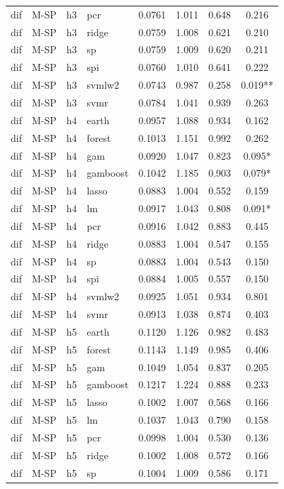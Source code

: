 \begin{ThreePartTable}
\begin{longtable}[t]{llclcccc}
dif & M-SP & h3 & pcr & 0.0761 & 1.011 & 0.648 & 0.216\\
dif & M-SP & h3 & ridge & 0.0759 & 1.008 & 0.621 & 0.210\\
dif & M-SP & h3 & sp & 0.0759 & 1.009 & 0.620 & 0.211\\
dif & M-SP & h3 & spi & 0.0760 & 1.010 & 0.641 & 0.222\\
dif & M-SP & h3 & svmlw2 & 0.0743 & 0.987 & 0.258 & 0.019**\\
dif & M-SP & h3 & svmr & 0.0784 & 1.041 & 0.939 & 0.263\\
\addlinespace
dif & M-SP & h4 & earth & 0.0957 & 1.088 & 0.934 & 0.162\\
dif & M-SP & h4 & forest & 0.1013 & 1.151 & 0.992 & 0.262\\
dif & M-SP & h4 & gam & 0.0920 & 1.047 & 0.823 & 0.095*\\
dif & M-SP & h4 & gamboost & 0.1042 & 1.185 & 0.903 & 0.079*\\
dif & M-SP & h4 & lasso & 0.0883 & 1.004 & 0.552 & 0.159\\
dif & M-SP & h4 & lm & 0.0917 & 1.043 & 0.808 & 0.091*\\
dif & M-SP & h4 & pcr & 0.0916 & 1.042 & 0.883 & 0.445\\
dif & M-SP & h4 & ridge & 0.0883 & 1.004 & 0.547 & 0.155\\
dif & M-SP & h4 & sp & 0.0883 & 1.004 & 0.543 & 0.150\\
dif & M-SP & h4 & spi & 0.0884 & 1.005 & 0.557 & 0.150\\
dif & M-SP & h4 & svmlw2 & 0.0925 & 1.051 & 0.934 & 0.801\\
dif & M-SP & h4 & svmr & 0.0913 & 1.038 & 0.874 & 0.403\\
\addlinespace
dif & M-SP & h5 & earth & 0.1120 & 1.126 & 0.982 & 0.483\\
dif & M-SP & h5 & forest & 0.1143 & 1.149 & 0.985 & 0.406\\
dif & M-SP & h5 & gam & 0.1049 & 1.054 & 0.837 & 0.205\\
dif & M-SP & h5 & gamboost & 0.1217 & 1.224 & 0.888 & 0.233\\
dif & M-SP & h5 & lasso & 0.1002 & 1.007 & 0.568 & 0.166\\
dif & M-SP & h5 & lm & 0.1037 & 1.043 & 0.790 & 0.158\\
dif & M-SP & h5 & pcr & 0.0998 & 1.004 & 0.530 & 0.136\\
dif & M-SP & h5 & ridge & 0.1002 & 1.008 & 0.572 & 0.166\\
dif & M-SP & h5 & sp & 0.1004 & 1.009 & 0.586 & 0.171\\

\end{longtable}
\end{ThreePartTable}
